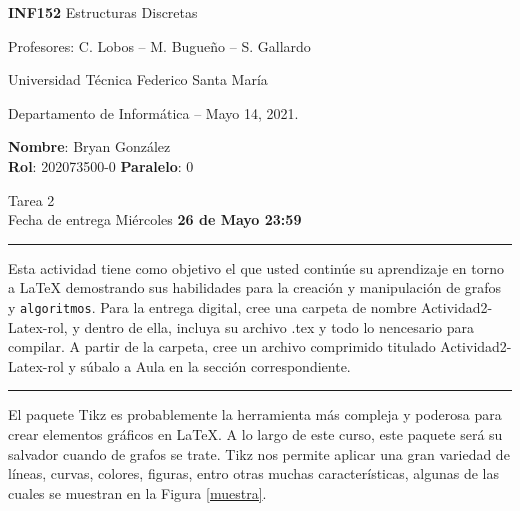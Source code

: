 \documentclass[letterpaper,10pt]{article}
\begin{document}
\thispagestyle{empty}

\begin{minipage}[t]{0.6\textwidth}
{\Large \textbf{INF152} Estructuras Discretas}

{\large Profesores: C. Lobos -- M. Bugueño -- S. Gallardo}

Universidad Técnica Federico Santa María

Departamento de Inform\'atica -- Mayo 14, 2021.

\end{minipage}
\hfill
\begin{minipage}[t]{0.35\textwidth}
\textbf{Nombre}: Bryan González\\[0.3cm]
\textbf{Rol}: 202073500-0 \textbf{Paralelo}: 0
\end{minipage}

\vspace{0cm}

\begin{center}
    {\Large Tarea 2} \\ Fecha de entrega Miércoles \textbf{26 de Mayo 23:59}
\end{center}

\hrule 
\vspace{0.2cm}
Esta actividad tiene como objetivo el que usted continúe su aprendizaje en torno a \LaTeX{} demostrando sus habilidades para la creación y manipulación de grafos y \texttt{algoritmos}. Para la entrega digital, cree una carpeta de nombre Actividad2-Latex-rol, y dentro de ella, incluya su archivo .tex y todo lo nencesario para compilar. A partir de la carpeta, cree un archivo comprimido titulado Actividad2-Latex-rol y súbalo a Aula en la sección correspondiente.

\vspace{0.2cm}
\hrule 

\vspace{0.4cm} 

\begin{minipage}{0.65\linewidth}
El paquete Tikz es probablemente la herramienta más compleja y poderosa para crear elementos gráficos en \LaTeX. A lo largo de este curso, este paquete será su salvador cuando de grafos se trate. Tikz nos permite aplicar una gran variedad de líneas, curvas, colores, figuras, entro otras muchas características, algunas de las cuales se muestran en la Figura \ref{muestra}.
\end{minipage}
\hfill
\begin{minipage}{0.32\linewidth}
          \centering
        \label{muestra}
\end{minipage}
\end{document}
